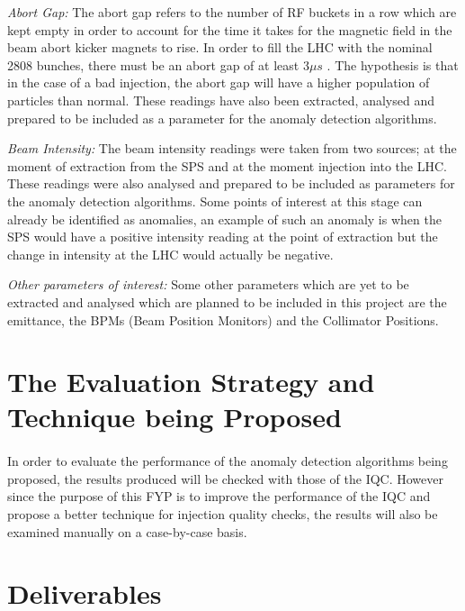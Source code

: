 \documentclass[12pt, twoside]{report}
\begin{document}
	\par \textit{Abort Gap:} The abort gap refers to the number of RF buckets in a row which are kept empty in order to account for the time it takes for the magnetic field in the beam abort kicker magnets to rise. In order to fill the LHC with the nominal 2808 bunches, there must be an abort gap of at least 3$\mu s$ \cite{r:AbortGap}. The hypothesis is that in the case of a bad injection, the abort gap will have a higher population of particles than normal. These readings have also been extracted, analysed and prepared to be included as a parameter for the anomaly detection algorithms.
	
	\par \textit{Beam Intensity:} The beam intensity readings were taken from two sources; at the moment of extraction from the SPS and at the moment injection into the LHC. These readings were also analysed and prepared to be included as parameters for the anomaly detection algorithms. Some points of interest at this stage can already be identified as anomalies, an example of such an anomaly is when the SPS would have a positive intensity reading at the point of extraction but the change in intensity at the LHC would actually be negative.
	
	\par \textit{Other parameters of interest:} Some other parameters which are yet to be extracted and analysed which are planned to be included in this project are the emittance, the BPMs (Beam Position Monitors) and the Collimator Positions. 
	
	\section{The Evaluation Strategy and Technique being Proposed}
	
	\paragraph{ } In order to evaluate the performance of the anomaly detection algorithms being proposed, the results produced will be checked with those of the IQC. However since the purpose of this FYP is to improve the performance of the IQC and propose a better technique for injection quality checks, the results will also be examined manually on a case-by-case basis.
	
	\section{Deliverables}
\end{document}
